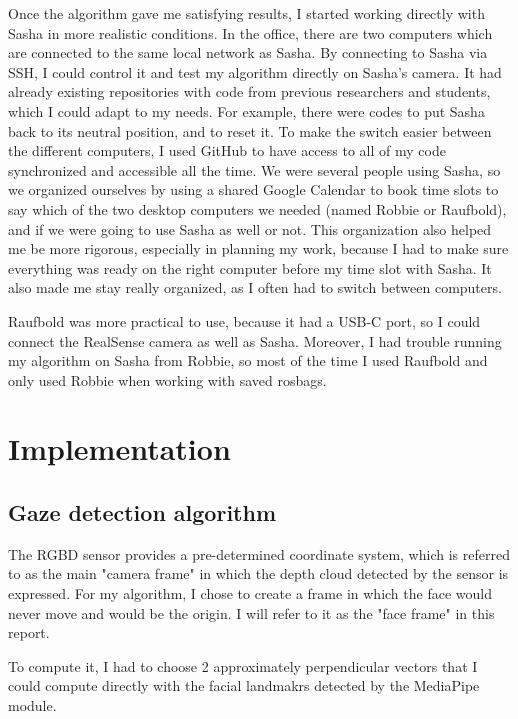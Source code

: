 Once the algorithm gave me satisfying results, I started working directly with Sasha in more realistic conditions. In the office, there are two computers which are connected to the same local network as Sasha. By connecting to Sasha via SSH, I could control it and test my algorithm directly on Sasha's camera. It had already existing repositories with code from previous researchers and students, which I could adapt to my needs. For example, there were codes to put Sasha back to its neutral position, and to reset it. To make the switch easier between the different computers, I used GitHub to have access to all of my code synchronized and accessible all the time. 
We were several people using Sasha, so we organized ourselves by using a shared Google Calendar to book time slots to say which of the two desktop computers we needed (named Robbie or Raufbold), and if we were going to use Sasha as well or not. This organization also helped me be more rigorous, especially in planning my work, because I had to make sure everything was ready on the right computer before my time slot with Sasha. It also made me stay really organized, as I often had to switch between computers.

Raufbold was more practical to use, because it had a USB-C port, so I could connect the RealSense camera as well as Sasha. Moreover, I had trouble running my algorithm on Sasha from Robbie, so most of the time I used Raufbold and only used Robbie when working with saved rosbags.


\newpage
\section{Implementation}

\subsection{Gaze detection algorithm}

The RGBD sensor provides a pre-determined coordinate system, which is referred to as the main "camera frame" in which the depth cloud detected by the sensor is expressed. For my algorithm, I chose to create a frame in which the face would never move and would be the origin. I will refer to it as the "face frame" in this report.

To compute it, I had to choose 2 approximately perpendicular vectors that I could compute directly with the facial landmakrs detected by the MediaPipe module.

